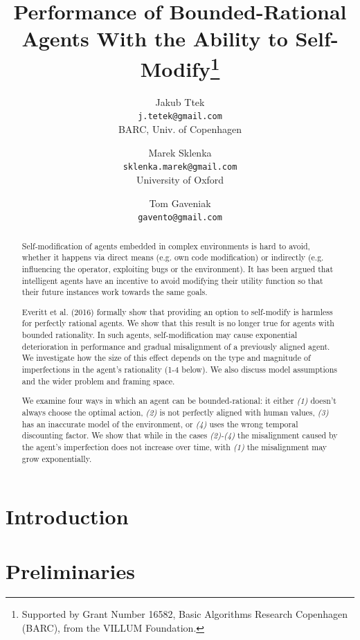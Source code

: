 \documentclass{article} %
\date{}
\title{Performance of Bounded-Rational Agents With the Ability to Self-Modify\thanks{Supported by Grant Number 16582, Basic Algorithms Research Copenhagen
(BARC), from the VILLUM Foundation.}
}
\author{
	Jakub Ttek\\
	\texttt{j.tetek@gmail.com}\\
	BARC, Univ. of Copenhagen
	\and
	Marek Sklenka\\
	\texttt{sklenka.marek@gmail.com}\\
	University of Oxford
	\and
	Tom Gaveniak\\
	\texttt{gavento@gmail.com}
}
\theoremstyle{remark}
\begin{document}
\maketitle
\begin{abstract}
Self-modification of agents embedded in complex environments is hard to avoid, whether it happens via direct means (e.g. own code modification) or indirectly (e.g. influencing the operator, exploiting bugs or the environment). It has been argued that intelligent agents have an incentive to avoid modifying their utility function so that their future instances work towards the same goals. %

Everitt et al. (2016) formally show that providing an option to self-modify is harmless for perfectly rational agents. We show that this result is no longer true for agents with bounded rationality. In such agents, self-modification may cause exponential deterioration in performance and gradual misalignment of a previously aligned agent. We investigate how the size of this effect depends on the type and magnitude of imperfections in the agent's rationality (1-4 below). We also discuss model assumptions and the wider problem and framing space.

We examine four ways in which an agent can be bounded-rational: it either \textit{(1)} doesn't always choose the optimal action, \textit{(2)} is not perfectly aligned with human values, \textit{(3)} has an inaccurate model of the environment, or \textit{(4)} uses the wrong temporal discounting factor. We show that while in the cases \textit{(2)-(4)} the misalignment caused by the agent's imperfection does not increase over time, with \textit{(1)} the misalignment may grow exponentially.

\end{abstract}

\section{Introduction}


\section{Preliminaries}\label{sec:preliminaries}

\end{document}
